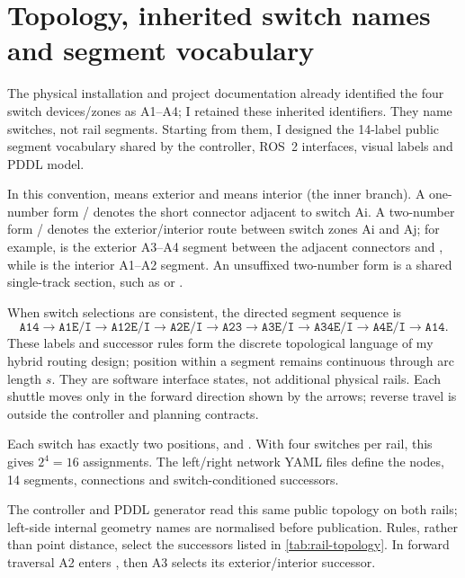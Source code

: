 \section{Topology, inherited switch names and segment vocabulary}

The physical installation and project documentation already identified the
four switch devices/zones as A1--A4; I retained these inherited identifiers.
They name switches, not rail segments. Starting from them, I designed the
14-label public segment vocabulary shared by the controller, ROS~2 interfaces,
visual labels and PDDL model.

In this convention,  means exterior and  means interior (the
inner branch). A one-number form / denotes the short
connector adjacent to switch Ai. A two-number form
/ denotes the exterior/interior route between switch
zones Ai and Aj; for example,  is the exterior A3--A4 segment between
the adjacent connectors  and , while  is the
interior A1--A2 segment. An unsuffixed two-number form is a shared single-track
section, such as  or .

When switch selections are consistent, the directed segment sequence is
\[
\texttt{A14} \rightarrow \texttt{A1E/I} \rightarrow \texttt{A12E/I}
\rightarrow \texttt{A2E/I} \rightarrow \texttt{A23} \rightarrow
\texttt{A3E/I} \rightarrow \texttt{A34E/I} \rightarrow
\texttt{A4E/I} \rightarrow \texttt{A14}.
\]
These labels and successor rules form the discrete topological language of my
hybrid routing design; position within a segment remains continuous through arc
length \(s\). They are software interface states, not additional physical rails.
Each shuttle moves only in the forward direction shown by the arrows; reverse
travel is outside the controller and planning contracts.

Each switch has exactly two positions,  and .
With four switches per rail, this gives \(2^4=16\) assignments. The left/right
network YAML files define the nodes, 14 segments, connections and
switch-conditioned successors.

The controller and PDDL generator read this same public topology on both rails;
left-side internal geometry names are normalised before publication. Rules,
rather than point distance, select the successors listed in
\cref{tab:rail-topology}. In forward traversal A2 enters , then A3
selects its exterior/interior successor.

